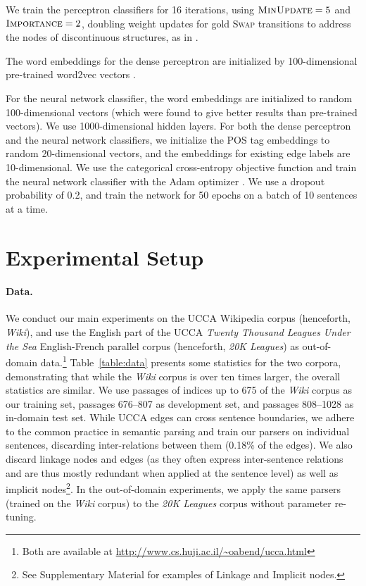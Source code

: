 \documentclass[11pt]{article}
\newcommand{\tabref}[1]{Table~\ref{#1}}
\begin{document}
We train the perceptron classifiers for 16 iterations, using $\textsc{MinUpdate}=5$
and $\textsc{Importance}=2$, doubling weight updates
for gold \textsc{Swap} transitions to address the nodes
of discontinuous structures, as in .

The word embeddings for the dense perceptron are initialized by 100-dimensional pre-trained
word2vec vectors \cite{mikolov2013efficient}.

For the neural network classifier, the word embeddings are initialized to random
100-dimensional vectors (which were found to give better results than pre-trained vectors).
We use 1000-dimensional hidden layers.
For both the dense perceptron and the neural network classifiers, we initialize the POS tag
embeddings to random 20-dimensional vectors, and the embeddings for existing edge labels are
10-dimensional.
We use the categorical cross-entropy objective function and train the neural network
classifier with the Adam optimizer \cite{kingma2014adam}. We use a dropout probability of 0.2,
and train the network for 50 epochs on a batch of 10 sentences at a time.

\section{Experimental Setup}\label{sec:exp_setup}

\paragraph{Data.}
We conduct our main experiments on the UCCA Wikipedia corpus (henceforth, \textit{Wiki}),
and use the English part of the UCCA \textit{Twenty Thousand Leagues Under the Sea} English-French parallel corpus (henceforth, \textit{20K Leagues}) as
out-of-domain data.\footnote{Both are available at \url{http://www.cs.huji.ac.il/~oabend/ucca.html}}
\tabref{table:data} presents some statistics for the two corpora, demonstrating that while
the \textit{Wiki} corpus is over ten times larger, the overall statistics are
similar.
We use passages of indices up to 675
of the \textit{Wiki} corpus as our training set, passages 676--807 as development set,
and passages 808--1028 as in-domain test set.
While UCCA edges can cross sentence boundaries, we adhere to the common
practice in semantic parsing and train our parsers on individual sentences,
discarding inter-relations between them (0.18\% of the edges).
We also discard linkage nodes and edges (as they often express inter-sentence
relations and are thus mostly redundant when applied at the sentence level)
as well as implicit nodes\footnote{See Supplementary Material for examples
of Linkage and Implicit nodes.}.
In the out-of-domain experiments, we apply the same parsers
(trained on the \textit{Wiki} corpus) to the \textit{20K Leagues} corpus
without parameter re-tuning.
\end{document}
